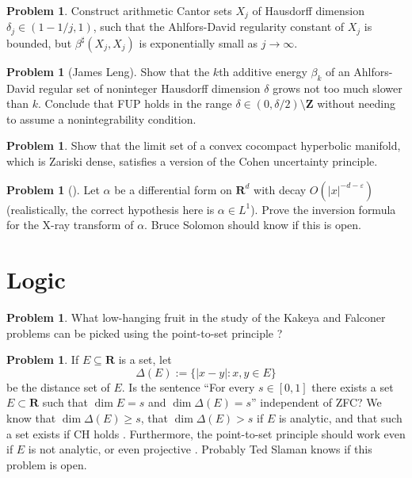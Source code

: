 \documentclass[reqno,11pt]{amsart}
\newcommand{\ZZ}{\mathbf{Z}}
\newcommand{\RR}{\mathbf{R}}
\theoremstyle{definition}
\newtheorem{problem}[theorem]{Problem}
\numberwithin{equation}{section}
\begin{document}
\begin{problem}
Construct arithmetic Cantor sets $X_j$ of Hausdorff dimension $\delta_j \in (1 - 1/j, 1)$, such that the Ahlfors-David regularity constant of $X_j$ is bounded, but $\beta^\sharp(X_j, X_j)$ is exponentially small as $j \to \infty$.
\end{problem}

\begin{problem}[James Leng]
Show that the $k$th additive energy $\beta_k$ of an Ahlfors-David regular set of noninteger Hausdorff dimension $\delta$ grows not too much slower than $k$.
Conclude that FUP holds in the range $\delta \in (0, \delta/2) \setminus \ZZ$ without needing to assume a nonintegrability condition.
\end{problem}

\begin{problem}
Show that the limit set of a convex cocompact hyperbolic manifold, which is Zariski dense, satisfies a version of the Cohen uncertainty principle.
\end{problem}

\begin{problem}[{\cite{Solomon11}}]
Let $\alpha$ be a differential form on $\RR^d$ with decay $O(|x|^{-d-\varepsilon})$ (realistically, the correct hypothesis here is $\alpha \in L^1$).
Prove the inversion formula for the X-ray transform of $\alpha$.
Bruce Solomon should know if this is open.
\end{problem}


\section{Logic}
\begin{problem}
What low-hanging fruit in the study of the Kakeya and Falconer problems can be picked using the point-to-set principle \cite{Lutz18}?
\end{problem}

\begin{problem}
If $E \subseteq \RR$ is a set, let 
$$\Delta(E) := \{|x - y|: x, y \in E\}$$
be the distance set of $E$.
Is the sentence ``For every $s \in [0, 1]$ there exists a set $E \subset \RR$ such that $\dim E = s$ and $\dim \Delta(E) = s$'' independent of ZFC?
We know that $\dim \Delta(E) \geq s$, that $\dim \Delta(E) > s$ if $E$ is analytic, and that such a set exists if CH holds \cite{Falconer85}.
Furthermore, the point-to-set principle should work even if $E$ is not analytic, or even projective \cite{Lutz18}.
Probably Ted Slaman knows if this problem is open.
\end{problem}
\end{document}

